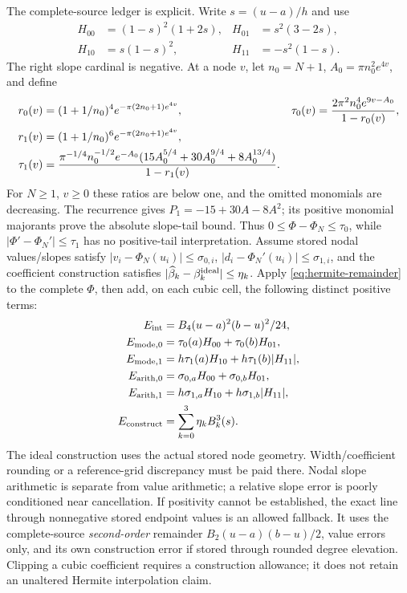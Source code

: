 The complete-source ledger is explicit. Write $s=(u-a)/h$ and use
\begin{align*}
 H_{00}&=(1-s)^2(1+2s),&H_{01}&=s^2(3-2s),\\
 H_{10}&=s(1-s)^2,&H_{11}&=-s^2(1-s).
\end{align*}
The right slope cardinal is negative. At a node $v$, let $n_0=N+1$,
$A_0=\pi n_0^2e^{4v}$, and define
\begin{align}
 r_0(v)&=(1+1/n_0)^4e^{-\pi(2n_0+1)e^{4v}},&
 \tau_0(v)&=\frac{2\pi^2n_0^4e^{9v-A_0}}{1-r_0(v)},\notag\\
 r_1(v)&=(1+1/n_0)^6e^{-\pi(2n_0+1)e^{4v}},\notag\\
 \tau_1(v)&=\frac{\pi^{-1/4}n_0^{-1/2}e^{-A_0}
 (15A_0^{5/4}+30A_0^{9/4}+8A_0^{13/4})}{1-r_1(v)}.
 \label{eq:hermite-nodal-tails}
\end{align}
For $N\ge1$, $v\ge0$ these ratios are below one, and the omitted
monomials are decreasing. The recurrence gives $P_1=-15+30A-8A^2$;
its positive monomial majorants prove the absolute slope-tail bound.
Thus $0\le\Phi-\Phi_N\le\tau_0$, while
$|\Phi'-\Phi_N'|\le\tau_1$ has no positive-tail interpretation.
Assume stored nodal values/slopes satisfy
$|v_i-\Phi_N(u_i)|\le\sigma_{0,i}$,
$|d_i-\Phi_N'(u_i)|\le\sigma_{1,i}$, and the coefficient construction
satisfies $|\widehat\beta_k-\beta_k^{\rm ideal}|\le\eta_k$.
Apply \eqref{eq:hermite-remainder} to the complete $\Phi$, then add,
on each cubic cell, the following distinct positive terms:
\begin{align}
 E_{\rm int}&=B_4(u-a)^2(b-u)^2/24,\notag\\
 E_{\rm mode,0}&=\tau_0(a)H_{00}+\tau_0(b)H_{01},\notag\\
 E_{\rm mode,1}&=h\tau_1(a)H_{10}+h\tau_1(b)|H_{11}|,\notag\\
 E_{\rm arith,0}&=\sigma_{0,a}H_{00}+\sigma_{0,b}H_{01},\notag\\
 E_{\rm arith,1}&=h\sigma_{1,a}H_{10}+h\sigma_{1,b}|H_{11}|,\notag\\
 E_{\rm construct}&=\sum_{k=0}^3\eta_kB_k^3(s).
 \label{eq:hermite-ledger}
\end{align}
The ideal construction uses the actual stored node geometry.
Width/coefficient rounding or a reference-grid discrepancy must be paid
there. Nodal slope arithmetic is separate from value arithmetic; a
relative slope error is poorly conditioned near cancellation.
If positivity cannot be established, the exact line through nonnegative
stored endpoint values is an allowed fallback. It uses the complete-source
\emph{second-order} remainder $B_2(u-a)(b-u)/2$, value errors only, and
its own construction error if stored through rounded degree elevation.
Clipping a cubic coefficient requires a construction allowance; it does
not retain an unaltered Hermite interpolation claim.

